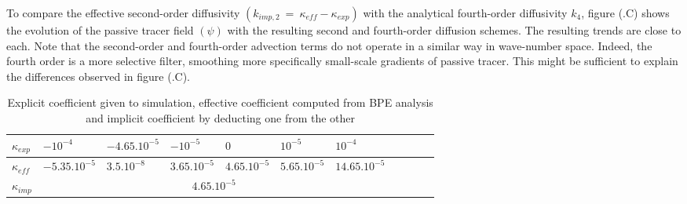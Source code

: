 To compare the effective second-order diffusivity $(k_{imp,2}\ =\ \kappa_{eff}-\kappa_{exp})$ with the analytical fourth-order diffusivity $k_4$, figure (.C) shows the evolution of the passive tracer field $(\psi)$ with the resulting second and fourth-order diffusion schemes. The resulting trends are close to each.
\color{red}Note that the second-order and fourth-order advection terms do not operate in a similar way in wave-number space. Indeed, the fourth order is a more selective filter, smoothing more specifically small-scale gradients of passive tracer. This might be sufficient to explain the differences observed in figure (.C).

\color{black}

\begin{table}[h!]
\centering
\begin{tabular}{|l|l|l|l|l|l|l|l|l|l|l|}
\hline
$\kappa_{exp}$ & $-10^{-4}$ &$-4.65.10^{-5}$ & $-10^{-5}$& $0$& $10^{-5}$& $10^{-4}$\\
\hline
$\kappa_{eff}$ & $-5.35.10^{-5}$ &$3.5.10^{-8}$ & $3.65.10^{-5}$& $4.65.10^{-5}$& $5.65.10^{-5}$& $14.65.10^{-5}$\\
\hline
$\kappa_{imp}$&\multicolumn{6}{c|}{$4.65.10^{-5}$}\\
\hline
\end{tabular}
\caption{Explicit coefficient given to simulation, effective coefficient computed from BPE analysis and implicit coefficient by deducting one from the other}
\label{table_kappa}
\end{table}

